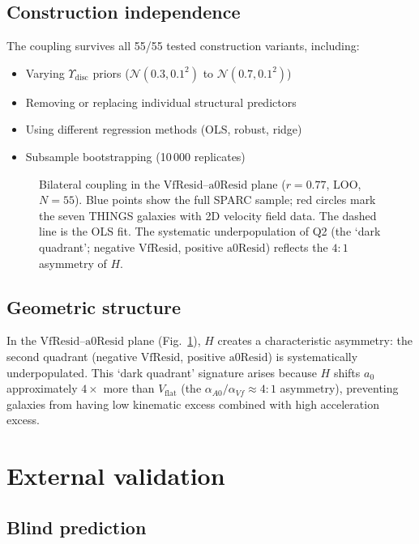 \documentclass[fleqn,usenatbib]{mnras}
\newcommand{\vflat}{V_\mathrm{flat}}
\newcommand{\azero}{a_0}
\newcommand{\vfresid}{\mathrm{VfResid}}
\newcommand{\aresid}{\mathrm{a0Resid}}
\begin{document}
\subsection{Construction independence}

The coupling survives all 55/55 tested construction variants, including:
\begin{itemize}
\item Varying $\Upsilon_\mathrm{disc}$ priors ($\mathcal{N}(0.3, 0.1^2)$ to $\mathcal{N}(0.7, 0.1^2)$)
\item Removing or replacing individual structural predictors
\item Using different regression methods (OLS, robust, ridge)
\item Subsample bootstrapping (10\,000 replicates)
\end{itemize}

\begin{figure}
\centering

\caption{Bilateral coupling in the $\vfresid$--$\aresid$ plane ($r = 0.77$, LOO, $N = 55$). Blue points show the full SPARC sample; red circles mark the seven THINGS galaxies with 2D velocity field data. The dashed line is the OLS fit. The systematic underpopulation of Q2 (the `dark quadrant'; negative $\vfresid$, positive $\aresid$) reflects the $4{:}1$ asymmetry of $H$.}
\label{fig:bilateral}
\end{figure}

\subsection{Geometric structure}

In the $\vfresid$--$\aresid$ plane (Fig.~\ref{fig:bilateral}), $H$ creates a characteristic asymmetry: the second quadrant (negative $\vfresid$, positive $\aresid$) is systematically underpopulated.
This `dark quadrant' signature arises because $H$ shifts $\azero$ approximately $4\times$ more than $\vflat$ (the $\alpha_{A0}/\alpha_{Vf} \approx 4{:}1$ asymmetry), preventing galaxies from having low kinematic excess combined with high acceleration excess.


\section{External validation}
\label{sec:external}

\subsection{Blind prediction}
\end{document}
